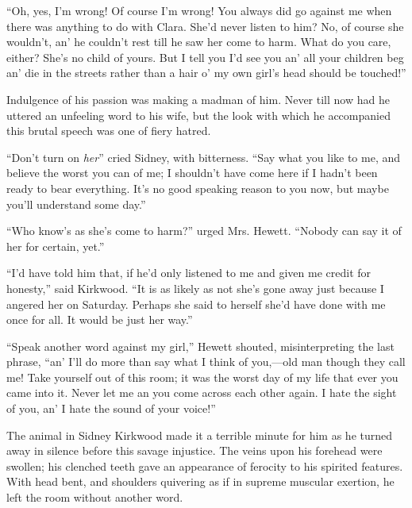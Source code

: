 ``Oh, yes, I'm wrong! Of course I'm wrong! You always did go against me
when there was anything to do with Clara. She'd never listen to him? No,
of course she wouldn't, an' he couldn't rest till he saw her come to
harm. What do you care, either? She's no child of yours. But I tell you
I'd see you an' all your children beg an' die in the streets rather than
a hair o' my own girl's head should be touched!''

Indulgence of his passion was making a madman of him. Never till now had
he uttered an unfeeling word to his wife, but the look with which he
accompanied this brutal speech was one of fiery hatred.

``Don't turn on \emph{her}'' cried Sidney, with bitterness. ``Say what
you like to me, and {\protect\hypertarget{287}{}{}}believe the worst you
can of me; I shouldn't have come here if I hadn't been ready to bear
everything. It's no good speaking reason to you now, but maybe you'll
understand some day.''

``Who know's as she's come to harm?'' urged Mrs. Hewett. ``Nobody can
say it of her for certain, yet.''

``I'd have told him that, if he'd only listened to me and given me
credit for honesty,'' said Kirkwood. ``It is as likely as not she's gone
away just because I angered her on Saturday. Perhaps she said to herself
she'd have done with me once for all. It would be just her way.''

``Speak another word against my girl,'' Hewett shouted, misinterpreting
the last phrase, ``an' I'll do more than say what I think of you,---old
man though they call me! Take yourself out of this room; it was the
worst day of my life that ever you came into it. Never let me an you
come across each other again. I hate the sight of you, an' I hate the
sound of your voice!''

{\protect\hypertarget{288}{}{}}The animal in Sidney Kirkwood made it a
terrible minute for him as he turned away in silence before this savage
injustice. The veins upon his forehead were swollen; his clenched teeth
gave an appearance of ferocity to his spirited features. With head bent,
and shoulders quivering as if in supreme muscular exertion, he left the
room without another word.

